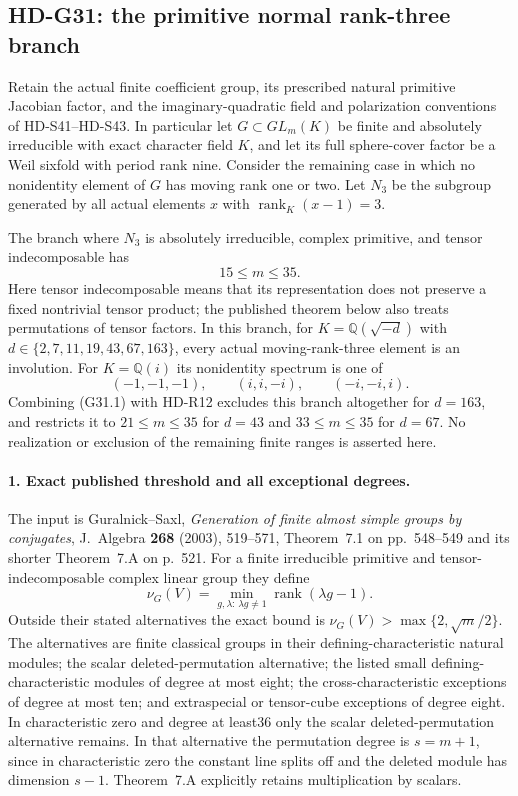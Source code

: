 \subsection{HD-G31: the primitive normal rank-three branch}
\label{sec:rank-three-primitive-scope}

Retain the actual finite coefficient group, its prescribed natural
primitive Jacobian factor, and the imaginary-quadratic field and
polarization conventions of HD-S41--HD-S43.  In particular let
$G\subset GL_m(K)$ be finite and absolutely irreducible with exact
character field $K$, and let its full sphere-cover factor be a Weil
sixfold with period rank nine.  Consider the remaining case in which
no nonidentity element of $G$ has moving rank one or two.  Let $N_3$
be the subgroup generated by all actual elements $x$ with
$\operatorname{rank}_K(x-1)=3$.

The branch where $N_3$ is absolutely irreducible, complex primitive,
and tensor indecomposable has
\[
                             15\le m\le35.                 \tag{G31.1}
\]
Here tensor indecomposable means that its representation does not
preserve a fixed nontrivial tensor product; the published theorem
below also treats permutations of tensor factors.  In this branch,
for $K=\mathbb Q(\sqrt{-d})$ with
$d\in\{2,7,11,19,43,67,163\}$, every actual moving-rank-three
element is an involution.  For $K=\mathbb Q(i)$ its nonidentity
spectrum is one of
\[
                  (-1,-1,-1),\qquad(i,i,-i),\qquad(-i,-i,i).
                                                               \tag{G31.2}
\]
Combining (G31.1) with HD-R12 excludes this branch altogether for
$d=163$, and restricts it to $21\le m\le35$ for $d=43$ and
$33\le m\le35$ for $d=67$.  No realization or exclusion of the
remaining finite ranges is asserted here.

\paragraph{1. Exact published threshold and all exceptional degrees.}
The input is Guralnick--Saxl, \emph{Generation of finite almost
simple groups by conjugates}, J.~Algebra \textbf{268} (2003),
519--571, Theorem~7.1 on pp.~548--549 and its shorter
Theorem~7.A on p.~521.  For a finite irreducible primitive
and tensor-indecomposable complex linear group they define
\[
 \nu_G(V)=\min_{g,\lambda:\,\lambda g\ne1}
                         \operatorname{rank}(\lambda g-1).
\]
Outside their stated alternatives the exact bound is
$\nu_G(V)>\max\{2,\sqrt m/2\}$.  The alternatives are
finite classical groups in their defining-characteristic natural
modules; the scalar deleted-permutation alternative; the listed
small defining-characteristic modules of degree at most eight;
the cross-characteristic exceptions of degree at most ten;
and extraspecial or tensor-cube exceptions of degree eight.
In characteristic zero and degree at least36 only the scalar
deleted-permutation alternative remains.  In that alternative
the permutation degree is $s=m+1$, since in characteristic zero
the constant line splits off and the deleted module has dimension
$s-1$.  Theorem~7.A explicitly retains multiplication by scalars.

